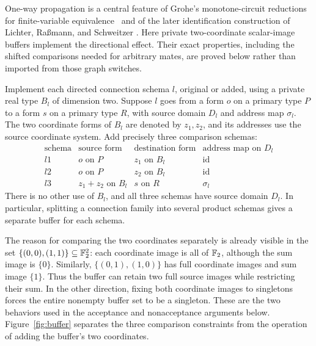 One-way propagation is a central feature of Grohe's monotone-circuit
reductions for finite-variable equivalence~\cite{Grohe1999} and of the
later identification construction of Lichter, Ra\ss mann, and Schweitzer
\cite[Section~5]{LRS2025}. Here private two-coordinate scalar-image
buffers implement the directional effect. Their exact properties,
including the shifted comparisons needed for arbitrary mates, are
proved below rather than imported from those graph switches.

Implement each directed connection schema \(l\), original or added, using a
private real type \(B_l\) of dimension two.  Suppose \(l\) goes from a form
\(o\) on a primary type \(P\) to a form \(s\) on a primary type \(R\), with
source domain \(D_l\) and address map \(\sigma_l\).  The two coordinate
forms of \(B_l\) are denoted by \(z_1,z_2\), and its addresses use the source
coordinate system.  Add precisely three comparison schemas:
\begin{equation}
\begin{array}{c|c|c|c}
 \text{schema}&\text{source form}&\text{destination form}
       &\text{address map on }D_l\\ \hline
 l1&o\text{ on }P&z_1\text{ on }B_l&\mathrm{id}\\
 l2&o\text{ on }P&z_2\text{ on }B_l&\mathrm{id}\\
 l3&z_1+z_2\text{ on }B_l&s\text{ on }R&\sigma_l
\end{array}
\label{eq:buffer}
\end{equation}
There is no other use of \(B_l\), and all three schemas have source domain
\(D_l\).  In particular, splitting a connection family into several product
schemas gives a separate buffer for each schema.

The reason for comparing the two coordinates separately is already
visible in the set $\{(0,0),(1,1)\}\subseteq\mathbb F_2^2$: each coordinate
image is all of $\mathbb F_2$, although the sum image is $\{0\}$.
Similarly, $\{(0,1),(1,0)\}$ has full coordinate images and sum image
$\{1\}$. Thus the buffer can retain two full source images while
restricting their sum. In the other direction, fixing both coordinate
images to singletons forces the entire nonempty buffer set to be a
singleton. These are the two behaviors used in the acceptance and
nonacceptance arguments below.
Figure~\ref{fig:buffer} separates the three comparison constraints
from the operation of adding the buffer's two coordinates.


